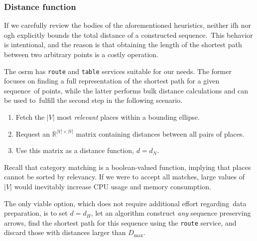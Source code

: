 \subsubsection*{Distance function}

If we carefully review the bodies of the aforementioned heuristics, neither \acs{ifh} nor \acs{ogh} explicitly bounds the total distance of a constructed sequence.~This be\-hav\-ior is intentional, and the reason is that obtaining the length of the shortest path between two arbitrary points is a costly operation.

The \acs{osrm} has \texttt{route} and \texttt{table} services suitable for our needs. The former focuses on finding a full representation of the shortest path for a given sequence~of points, while the latter performs bulk distance calculations and can be used to~fulfill the second step in the following scenario.

\begin{enumerate}
\item Fetch the $\lvert V \rvert$ most \emph{relevant} places within a bounding ellipse.
\item Request an $\mathbb{R}^{\lvert V \rvert \times \lvert V \rvert}$ matrix containing distances between all pairs of places.
\item Use this matrix as a distance function, $d = d_{N}$.
\end{enumerate}

Recall that category matching is a boolean-valued function, implying that places cannot be sorted by relevancy. If we were to accept all matches, large values of~$\lvert V \rvert$ would inevitably increase CPU usage and memory consumption.

The only viable option, which does not require additional effort regarding~data preparation, is to set $d = d_{H}$, let an algorithm construct \emph{any} sequence preserving arrows, find the shortest path for this sequence using the \texttt{route} service, and discard those with distances larger than $D_{\text{max}}$.
